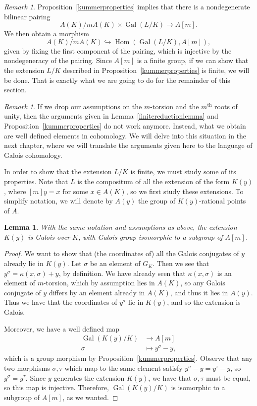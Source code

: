 \documentclass[a4paper, 12pt]{amsart}
\theoremstyle{definition}
\theoremstyle{plain}
\theoremstyle{plain}
\theoremstyle{plain}
\newtheorem{lemma0}[defn0]{Lemma}
\theoremstyle{plain}
\theoremstyle{remark}
\theoremstyle{remark}
\newtheorem{remark0}[defn0]{Remark}
\theoremstyle{plain}
\newenvironment{lemma}{ \begin{lemma0}}{\end{lemma0}}
\newenvironment{remark}{ \begin{remark0}\rm}{\end{remark0}}
\newcommand{\propref}[1]{Proposition~\ref{#1}}
\newcommand{\lemref}[1]{Lemma~\ref{#1}}
\DeclareMathOperator{\Gal}{Gal}
\DeclareMathOperator{\Hom}{Hom}
\begin{document}
	\begin{remark}
		\propref{kummerproperties} implies that there is a nondegenerate bilinear pairing
		\begin{equation*}
			A(K)/mA(K)\times\Gal(L/K)\rightarrow A[m].
		\end{equation*}
		We then obtain a morphism
		\begin{equation*}
			A(K)/mA(K)\hookrightarrow\Hom(\Gal(L/K),A[m]),
		\end{equation*}
		given by fixing the first component of the pairing, which is injective by the nondegeneracy of the pairing. Since $A[m]$ is a finite group, if we can show that the extension $L/K$ described in \propref{kummerproperties} is finite, we will be done. That is exactly what we are going to do for the remainder of this section.
	\end{remark}
	\begin{remark}
		If we drop our assumptions on the $m$-torsion and the $m^\text{th}$ roots of unity, then the arguments given in \lemref{finitereductionlemma} and \propref{kummerproperties} do not work anymore. Instead, what we obtain are well defined elements in cohomology. We will delve into this situation in the next chapter, where we will translate the arguments given here to the language of Galois cohomology.
	\end{remark}
	In order to show that the extension $L/K$ is finite, we must study some of its properties. Note that $L$ is the compositum of all the extension of the form $K(y)$, where $[m]y=x$ for some $x\in A(K)$, so we first study these extensions. To simplify notation, we will denote by $A(y)$ the group of $K(y)$-rational points of $A$.
	\begin{lemma}
		With the same notation and assumptions as above, the extension $K(y)$ is Galois over $K$, with Galois group isomorphic to a subgroup of $A[m]$.
	\end{lemma}
	\begin{proof}
		We want to show that (the coordinates of) all the Galois conjugates of $y$ already lie in $K(y)$. Let $\sigma$ be an element of $G_K$. Then we see that $y^\sigma=\kappa(x,\sigma)+y$, by definition. We have already seen that $\kappa(x,\sigma)$ is an element of $m$-torsion, which by assumption lies in $A(K)$, so any Galois conjugate of $y$ differs by an element already in $A(K)$, and thus it lies in $A(y)$. Thus we have that the coordinates of $y^\sigma$ lie in $K(y)$, and so the extension is Galois.
		
		Moreover, we have a well defined map
		\begin{align*}
			\Gal(K(y)/K)&\rightarrow A[m]\\
			\sigma &\mapsto y^\sigma-y,
		\end{align*}
		which is a group morphism by \propref{kummerproperties}. Observe that any two morphisms $\sigma,\tau$ which map to the same element satisfy $y^\sigma-y=y^\tau-y$, so $y^\sigma=y^\tau$. Since $y$ generates the extension $K(y)$, we have that $\sigma,\tau$ must be equal, so this map is injective. Therefore, $\Gal(K(y)/K)$ is isomorphic to a subgroup of $A[m]$, as we wanted.
	\end{proof}
\end{document}
